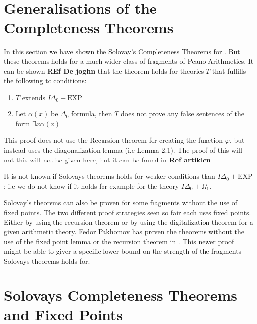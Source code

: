 \documentclass[../main.tex]{subfiles}
\begin{document}
\section{Generalisations  of the Completeness Theorems}

In this section we have shown the Solovay's Completeness Theorems for \PRA.
But these theorems holds for a much wider class of fragments of Peano
Arithmetics. It can be shown \textbf{REf De joghn} that the theorem holds for
theories $T$ that fulfills the following to conditions:
\begin{enumerate}
	\item $T$ extends $I\Delta_0+\text{EXP}$
	\item Let $\alpha(x)$ be $ \Delta_0$ formula, then $T$ does not prove any
		false sentences of the form $\exists x\alpha(x)$
\end{enumerate}

This proof does not use the Recursion theorem for creating the function
$\varphi$, but instead uses the diagonalization lemma (i.e Lemma 2.1). The
proof of this will not this will not be given here, but it can be found in
\textbf{Ref artiklen}.

It is not known if Solovays theorems holds for weaker conditions than
$I\Delta_0+\text{EXP}$; i.e we do not know if it holds for example for the theory
$I\Delta_0+\Omega_1$.


Solovay's theorems can also be proven for some fragments without the use of
fixed points. The two different proof strategies seen so fair each uses fixed
points. Either by using the recursion theorem or by using the digitalization
theorem for a given arithmetic theory. Fedor Pakhomov has proven the theorems
without the use of the fixed point lemma or the recursion theorem in
\cite{Fedo2017}. This
newer proof might be able to giver a specific lower bound on the strength of
the fragments Solovays theorems holds for.

\section{Solovays Completeness Theorems and Fixed Points}
\end{document}
